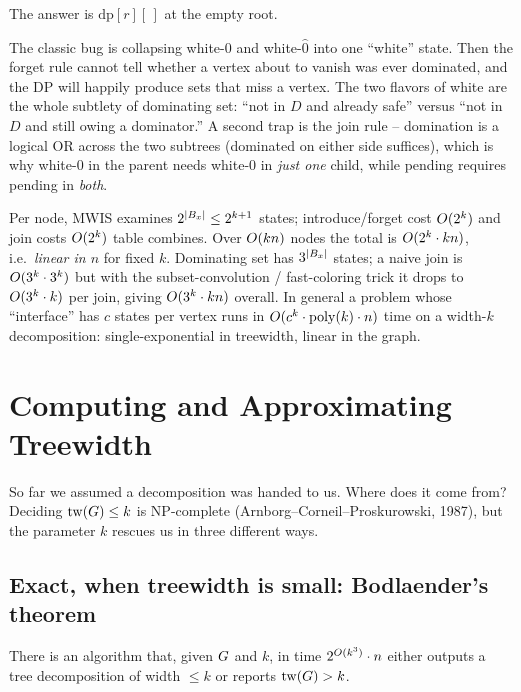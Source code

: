 The answer is $\mathrm{dp}[r][\,]$ at the empty root.

\begin{trapbox}
The classic bug is collapsing white-$0$ and white-$\hat0$ into one ``white''
state. Then the forget rule cannot tell whether a vertex about to vanish was ever
dominated, and the DP will happily produce sets that miss a vertex. The two
flavors of white are the whole subtlety of dominating set: ``not in $D$ and
already safe'' versus ``not in $D$ and still owing a dominator.'' A second trap is
the join rule -- domination is a logical OR across the two subtrees (dominated on
either side suffices), which is why white-$0$ in the parent needs white-$0$ in
\emph{just one} child, while pending requires pending in \emph{both}.
\end{trapbox}

\begin{complexitybox}
Per node, MWIS examines $2^{\lvert B_x\rvert}\le 2^{k+1}$ states; introduce/forget cost
$O(2^{k})$ and join costs $O(2^{k})$ table combines. Over $O(kn)$ nodes the
total is $O(2^k\cdot kn)$, i.e.\ \emph{linear in $n$} for fixed $k$. Dominating
set has $3^{\lvert B_x\rvert}$ states; a naive join is $O(3^k\cdot 3^k)$ but with the
subset-convolution / fast-coloring trick it drops to $O(3^k\cdot k)$ per join,
giving $O(3^k\cdot kn)$ overall. In general a problem whose ``interface'' has
$c$ states per vertex runs in $O(c^k\cdot\operatorname{poly}(k)\cdot n)$ time on a width-$k$
decomposition: single-exponential in treewidth, linear in the graph.
\end{complexitybox}

\section{Computing and Approximating Treewidth}
\label{ch24:compute}

So far we assumed a decomposition was handed to us. Where does it come from?
Deciding $\operatorname{tw}(G)\le k$ is NP-complete (Arnborg--Corneil--Proskurowski, 1987),
but the parameter $k$ rescues us in three different ways.

\subsection{Exact, when treewidth is small: Bodlaender's theorem}

\begin{theorem}[Bodlaender, 1996]
\label{ch24:thm-bodlaender}
There is an algorithm that, given $G$ and $k$, in time $2^{O(k^3)}\cdot n$
either outputs a tree decomposition of width $\le k$ or reports $\operatorname{tw}(G)>k$.
\end{theorem}

